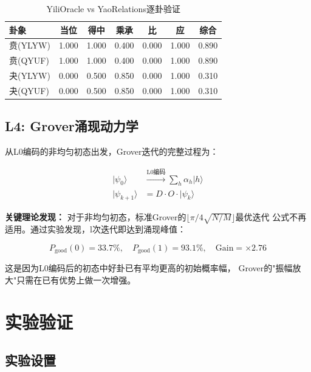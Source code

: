 \documentclass[twocolumn]{article}
\begin{document}
\begin{table}[htbp]
\centering
\caption{YiliOracle vs YaoRelations逐卦验证}
\label{tab:con}
\begin{tabular}{lcccccc}
\toprule
\textbf{卦象} & \textbf{当位} & \textbf{得中} & \textbf{乘承} & \textbf{比} & \textbf{应} & \textbf{综合} \\
\midrule
贲(YLYW) & 1.000 & 1.000 & 0.400 & 0.000 & 1.000 & 0.890 \\
贲(QYUF) & 1.000 & 1.000 & 0.400 & 0.000 & 1.000 & 0.890 \\
\midrule
夬(YLYW) & 0.000 & 0.500 & 0.850 & 0.000 & 1.000 & 0.310 \\
夬(QYUF) & 0.000 & 0.500 & 0.850 & 0.000 & 1.000 & 0.310 \\
\bottomrule
\end{tabular}
\end{table}

\subsection{L4: Grover涌现动力学}

从L0编码的非均匀初态出发，Grover迭代的完整过程为：

\begin{align}
    |\psi_0\rangle &\xrightarrow{\text{L0编码}} \sum_h \alpha_h |h\rangle \\
    |\psi_{k+1}\rangle &= D \cdot O \cdot |\psi_k\rangle
\end{align}

\noindent \textbf{关键理论发现：} 对于非均匀初态，标准Grover的$\lfloor \pi/4\sqrt{N/M}\rfloor$最优迭代
公式不再适用。通过实验发现，l次迭代即达到涌现峰值：

\begin{equation}
    P_{\text{good}}(0) = 33.7\%, \quad
    P_{\text{good}}(1) = 93.1\%, \quad
    \text{Gain} = \times 2.76
\end{equation}

\noindent 这是因为L0编码后的初态中好卦已有平均更高的初始概率幅，
Grover的"振幅放大"只需在已有优势上做一次增强。

\section{实验验证}

\subsection{实验设置}
\end{document}
